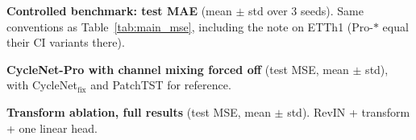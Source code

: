 \documentclass[11pt,a4paper]{article}
\begin{document}
\begin{table}[p]
\centering
\resizebox{\textwidth}{!}{%
%
}
\caption{\textbf{Controlled benchmark: test MAE} (mean $\pm$ std over 3 seeds). Same conventions as Table~\ref{tab:main_mse}, including the note on ETTh1 (Pro-$\ast$ equal their CI variants there).}
\label{tab:main_mae}
\end{table}

\begin{table}[p]
\centering
\resizebox{0.85\textwidth}{!}{%
%
}
\caption{\textbf{CycleNet-Pro with channel mixing forced off} (test MSE, mean $\pm$ std), with CycleNet$_{\text{fix}}$ and PatchTST for reference.}
\label{tab:ci_full}
\end{table}

\begin{table}[p]
\centering
\resizebox{0.9\textwidth}{!}{%
%
}
\caption{\textbf{Transform ablation, full results} (test MSE, mean $\pm$ std). RevIN + transform + one linear head.}
\label{tab:transform_full}
\end{table}
\end{document}
